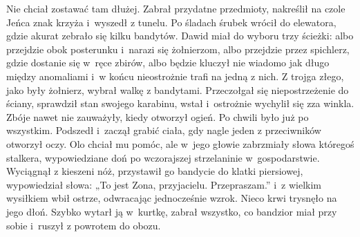 \documentclass[../MAIN.tex]{subfiles}
\begin{document}
Nie chciał zostawać tam dłużej. Zabrał przydatne przedmioty, nakreślił na czole Jeńca znak krzyża i~wyszedł z tunelu. Po śladach śrubek wrócił do elewatora, gdzie akurat zebrało się kilku bandytów. Dawid miał do wyboru trzy ścieżki: albo przejdzie obok posterunku i~narazi się żołnierzom, albo przejdzie przez spichlerz, gdzie dostanie się w~ręce zbirów, albo będzie kluczył nie wiadomo jak długo między anomaliami i~w końcu nieostrożnie trafi na jedną z nich. Z trojga złego, jako były żołnierz, wybrał walkę z bandytami. Przeczołgał się niepostrzeżenie do ściany, sprawdził stan swojego karabinu, wstał i~ostrożnie wychylił się zza winkla. Zbóje nawet nie zauważyły, kiedy otworzył ogień. Po chwili było już po wszystkim. Podszedł i~zaczął grabić ciała, gdy nagle jeden z przeciwników otworzył oczy. Olo chciał mu pomóc, ale w~jego głowie zabrzmiały słowa któregoś stalkera, wypowiedziane doń po wczorajszej strzelaninie w~gospodarstwie. Wyciągnął z kieszeni nóż, przystawił go bandycie do klatki piersiowej,
wypowiedział słowa: „To jest Zona, przyjacielu. Przepraszam.” i~z wielkim wysiłkiem wbił ostrze, odwracając jednocześnie wzrok. Nieco krwi trysnęło na jego dłoń. Szybko wytarł ją w~kurtkę, zabrał wszystko, co bandzior miał przy sobie i~ruszył z powrotem do obozu.
\end{document}
